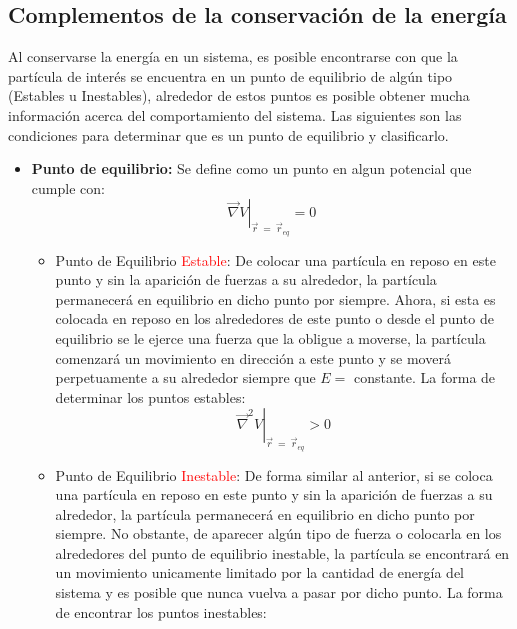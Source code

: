 \documentclass[/home/hernan/Documentos/Apuntes_mecanica_teorica/main.tex]{subfiles}
\begin{document}
	\newpage
	\subsection{Complementos de la conservación de la energía}

	\begin{definition}
		
		Al conservarse la energía en un sistema, es posible encontrarse con que la partícula de interés se encuentra en un punto de equilibrio de algún tipo (Estables u Inestables), alrededor de estos puntos es posible obtener mucha información acerca del comportamiento del sistema. Las siguientes son las condiciones para determinar que es un punto de equilibrio y clasificarlo.

		\begin{itemize}
			\item \textbf{Punto de equilibrio: } Se define como un punto en algun potencial que cumple con: \\ 
				\begin{equation}
				\left .  \vec{\nabla }V \right|_{\vec{r} \: = \: \vec{r}_{eq}} = 0
				\end{equation}
			\begin{itemize}
				\item Punto de Equilibrio \textcolor{red}{Estable}: De colocar una partícula en reposo en este punto y sin la aparición de fuerzas a su alrededor, la partícula permanecerá en equilibrio en dicho punto por siempre. Ahora, si esta es colocada en reposo en los alrededores de este punto o desde el punto de equilibrio se le ejerce una fuerza que la obligue a moverse, la partícula comenzará un movimiento en dirección a este punto y se moverá perpetuamente a su alrededor siempre que $E =$ constante. La forma de determinar los puntos estables: \\ 
				\begin{equation}
					\left .  \vec{\nabla }^{2}V \right|_{\vec{r} \: = \: \vec{r}_{eq}} > 0
					\label{eq: puntoestable}
				\end{equation}
				\item Punto de Equilibrio \textcolor{red}{Inestable}: De forma similar al anterior, si se coloca una partícula en reposo en este punto y sin la aparición de fuerzas a su alrededor, la partícula permanecerá en equilibrio en dicho punto por siempre. No obstante, de aparecer algún tipo de fuerza o colocarla en los alrededores del punto de equilibrio inestable, la partícula se encontrará en un movimiento unicamente limitado por la cantidad de energía del sistema y es posible que nunca vuelva a pasar por dicho punto. La forma de encontrar los puntos inestables: \\  

\end{itemize}
\end{itemize}
\end{definition}
\end{document}
